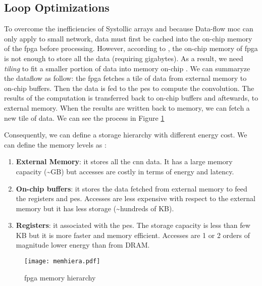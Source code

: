 \subsection{Loop Optimizations} \label{subsec:loopopti}
%
%
To overcome the inefficiencies of Systollic arrays and because Data-flow \acrshort{moc} can only apply to small network, data must first be cached into the on-chip memory of the \acrshort{fpga} before processing. However, according to \textcite{ma_optimizing_2018}, the on-chip memory of \acrshort{fpga} is not enough to store all the data (requiring gigabytes). As a result, we need \textit{tiling} to fit a smaller portion of data into memory on-chip \cite{zhang_optimizing_2015}. We can summaryze the dataflow as follow: the \acrshort{fpga} fetches a tile of data from external memory to on-chip buffers. Then the data is fed to the \acrshort{pe}s to compute the convolution. The results of the computation is transferred back to on-chip buffers and aftewards, to external memory. When the results are written back to memory, we can fetch a new tile of data. We can see the process in Figure \ref{fig:hierarchy}

Consequently, we can define a storage hierarchy with different energy cost. We can define the memory levels as \cite{horowitz_11_2014, sze_efficient_2017}:
%
\begin{enumerate}
    \item \textbf{External Memory}: it stores all the \acrshort{cnn} data. It has a large memory capacity (\textasciitilde GB) but accesses are costly in terms of energy and latency.
    \item \textbf{On-chip buffers}: it stores the data fetched from external memory to feed the registers and \acrshort{pe}s. Accesses are less expensive with respect to the external memory but it has less storage (\textasciitilde hundreds of KB).
    \item \textbf{Registers}: it associated with the \acrshort{pe}s. The storage capacity is less than few KB but it is more faster and memory efficient. Accesses are 1 or 2 orders of magnitude lower energy than from DRAM.
\end{enumerate}
%
\begin{figure}
    \centering
    \texttt{[image: memhiera.pdf]}
    \caption{\acrshort{fpga} memory hierarchy \cite{ma_optimizing_2018}}
    \label{fig:hierarchy}
\end{figure}


